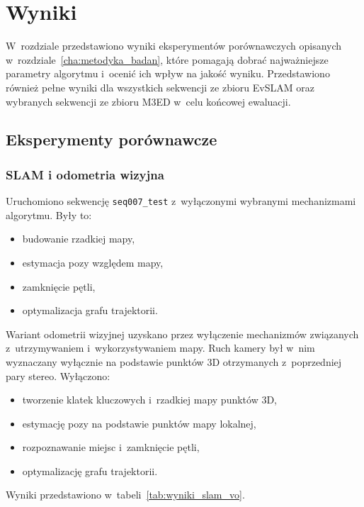 \chapter{Wyniki}
\label{cha:wyniki}

W~rozdziale przedstawiono wyniki eksperymentów porównawczych opisanych w~rozdziale~\ref{cha:metodyka_badan}, które pomagają dobrać najważniejsze parametry algorytmu i~ocenić ich wpływ na jakość wyniku. Przedstawiono również pełne wyniki dla wszystkich sekwencji ze zbioru EvSLAM oraz wybranych sekwencji ze zbioru M3ED w~celu końcowej ewaluacji.

\section{Eksperymenty porównawcze}
\label{sec:wyniki_eksperymenty}

\subsection{SLAM i odometria wizyjna}
\label{subsec:wyniki_slam_vo}

Uruchomiono sekwencję \texttt{seq007\_test} z~wyłączonymi wybranymi mechanizmami algorytmu. Były to:
\begin{itemize}
    \item budowanie rzadkiej mapy,
    \item estymacja pozy względem mapy,
    \item zamknięcie pętli,
    \item optymalizacja grafu trajektorii.
\end{itemize}

Wariant odometrii wizyjnej uzyskano przez wyłączenie mechanizmów związanych z~utrzymywaniem i~wykorzystywaniem mapy. Ruch kamery był w~nim wyznaczany wyłącznie na podstawie punktów 3D otrzymanych z~poprzedniej pary stereo. Wyłączono:
\begin{itemize}
    \item tworzenie klatek kluczowych i~rzadkiej mapy punktów 3D,
    \item estymację pozy na podstawie punktów mapy lokalnej,
    \item rozpoznawanie miejsc i~zamknięcie pętli,
    \item optymalizację grafu trajektorii.
\end{itemize}

Wyniki przedstawiono w~tabeli~\ref{tab:wyniki_slam_vo}.

